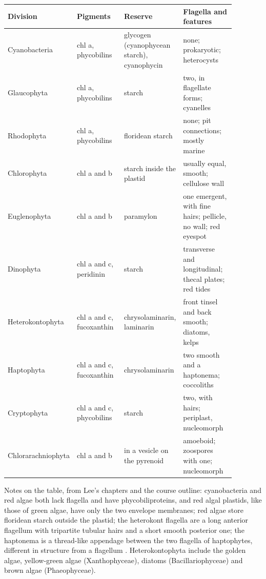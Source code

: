 \begin{center}
\begin{tabular}{p{0.21\linewidth}
p{0.23\linewidth}p{0.18\linewidth}
p{0.26\linewidth}}
Division & Pigments & Reserve &
Flagella and features \\
\hline
Cyanobacteria & chl a, phycobilins &
glycogen (cyanophycean starch),
cyanophycin & none; prokaryotic;
heterocysts \\
Glaucophyta & chl a, phycobilins &
starch & two, in flagellate forms;
cyanelles \\
Rhodophyta & chl a, phycobilins &
floridean starch & none; pit
connections; mostly marine \\
Chlorophyta & chl a and b & starch
inside the plastid & usually equal,
smooth; cellulose wall \\
Eugleno\-phyta & chl a and b &
paramylon & one emergent, with fine
hairs; pellicle, no wall; red eyespot \\
Dinophyta & chl a and c, peridinin &
starch & transverse and longitudinal;
thecal plates; red tides \\
Heterokonto\-phyta & chl a and c,
fucoxanthin & chryso\-laminarin,
laminarin & front tinsel and back
smooth; diatoms, kelps \\
Haptophyta & chl a and c,
fucoxanthin & chryso\-laminarin & two
smooth and a haptonema; coccoliths \\
Cryptophyta & chl a and c, phycobilins
& starch & two, with hairs; periplast,
nucleomorph \\
Chlorarachnio\-phyta & chl a and b &
in a vesicle on the pyrenoid &
amoeboid; zoospores with one;
nucleomorph \\
\end{tabular}
\end{center}

Notes on the table, from Lee's chapters and
the course outline: cyanobacteria and red algae
both lack flagella and have
phycobiliproteins, and red algal plastids,
like those of green algae, have only the two
envelope membranes; red algae store floridean
starch outside the plastid; the heterokont
flagella are a long anterior flagellum with
tripartite tubular hairs and a short smooth
posterior one; the haptonema is a thread-like
appendage between the two flagella of
haptophytes, different in structure from a
flagellum \cite[Chapter
22]{lee2008phycology}. Heterokontophyta
include the golden algae, yellow-green algae
(Xanthophyceae), diatoms (Bacillariophyceae)
and brown algae (Phaeophyceae).


